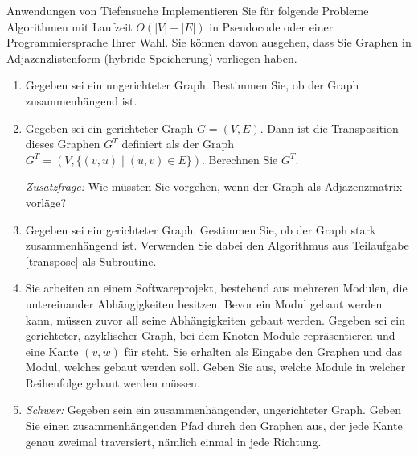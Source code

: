\documentclass[11pt,a4paper]{article}
\begin{document}
\begin{aufgabe}{4}{Anwendungen von Tiefensuche}
    Implementieren Sie für folgende Probleme Algorithmen mit Laufzeit $O(|V| + |E|)$ in Pseudocode oder einer Programmiersprache Ihrer Wahl.
    Sie können davon ausgehen, dass Sie Graphen in Adjazenzlistenform (hybride Speicherung) vorliegen haben.
    \begin{enumerate}[label=\alph*)]
        \item 
        Gegeben sei ein ungerichteter Graph.
        Bestimmen Sie, ob der Graph zusammenhängend ist.
        \item \label{transpose} Gegeben sei ein gerichteter Graph $G = (V, E)$. Dann ist die Transposition dieses Graphen $G^T$ definiert als der Graph $G^T = (V, \{(v, u) \mid (u, v) \in E\})$.
        Berechnen Sie $G^T$.
        
        \emph{Zusatzfrage:} Wie müssten Sie vorgehen, wenn der Graph als Adjazenzmatrix vorläge?
        \item 
        Gegeben sei ein gerichteter Graph.
        Gestimmen Sie, ob der Graph stark zusammenhängend ist.
        Verwenden Sie dabei den Algorithmus aus Teilaufgabe \ref*{transpose} als Subroutine.
        \item
        Sie arbeiten an einem Softwareprojekt, bestehend aus mehreren Modulen, die untereinander Abhängigkeiten besitzen.
        Bevor ein Modul gebaut werden kann, müssen zuvor all seine Abhängigkeiten gebaut werden.
        Gegeben sei ein gerichteter, azyklischer Graph, bei dem Knoten Module repräsentieren und eine Kante $(v, w)$ für  steht.
        Sie erhalten als Eingabe den Graphen und das Modul, welches gebaut werden soll.
        Geben Sie aus, welche Module in welcher Reihenfolge gebaut werden müssen.
        \item
        \emph{Schwer:} Gegeben sein ein zusammenhängender, ungerichteter Graph.
        Geben Sie einen zusammenhängenden Pfad durch den Graphen aus, der jede Kante genau zweimal traversiert, nämlich einmal in jede Richtung.
    \end{enumerate}
\end{aufgabe}
\end{document}
